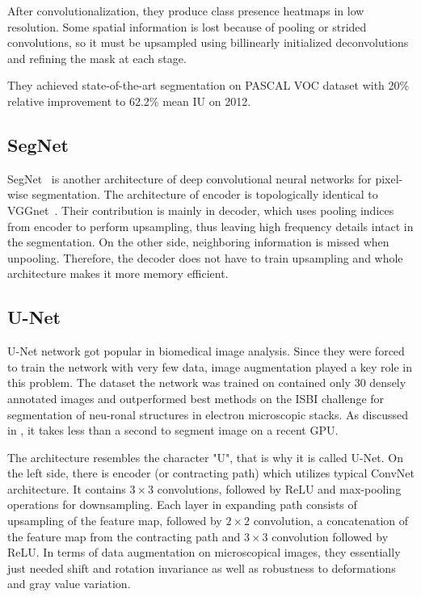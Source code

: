 After convolutionalization, they produce class presence heatmaps in low resolution.
Some spatial information is lost because of pooling or strided convolutions,
so it must be upsampled using billinearly initialized deconvolutions and refining
the mask at each stage.

They achieved state-of-the-art segmentation on PASCAL VOC dataset with 20\% relative improvement to 62.2\% mean IU on 2012.

\subsection{SegNet}
\label{sec:semantic_seg_cnn:segnet}

SegNet~\cite{bib:badrinarayanan2015segnet} is another architecture of deep
convolutional neural networks for pixel-wise segmentation. The architecture
of encoder is topologically identical to VGGnet~\cite{bib:simonyan2014very}.
Their contribution is mainly in decoder, which uses pooling indices from encoder
to perform upsampling, thus leaving high frequency details intact in the segmentation.
On the other side, neighboring information is missed when unpooling.
Therefore, the decoder does not have to train upsampling and whole architecture
makes it more memory efficient.

\subsection{U-Net}
\label{sec:semantic_seg_cnn:unet}

U-Net network \cite{bib:ronneberger2015u} got popular in biomedical image analysis.
Since they were forced to train the network with very few data, image augmentation
played a key role in this problem. The dataset the network was trained on contained
only 30 densely annotated images and outperformed best methods on the ISBI challenge
for segmentation of neu-ronal structures in electron microscopic stacks. As discussed in
\cite{bib:ronneberger2015u}, it takes less than a second to segment image on a recent
GPU.

The architecture resembles the character "U", that is why it is called U-Net. On the left
side, there is encoder (or contracting path) which utilizes typical ConvNet architecture.
It contains $3\times3$ convolutions, followed by ReLU and max-pooling operations
for downsampling. Each layer in expanding path consists of upsampling of the feature map,
followed by $2\times2$ convolution, a concatenation of the feature map from the
contracting path and $3\times3$ convolution followed by ReLU. In terms of
data augmentation on microscopical images, they essentially just needed
shift and rotation invariance as well as robustness to deformations and gray value
variation.

